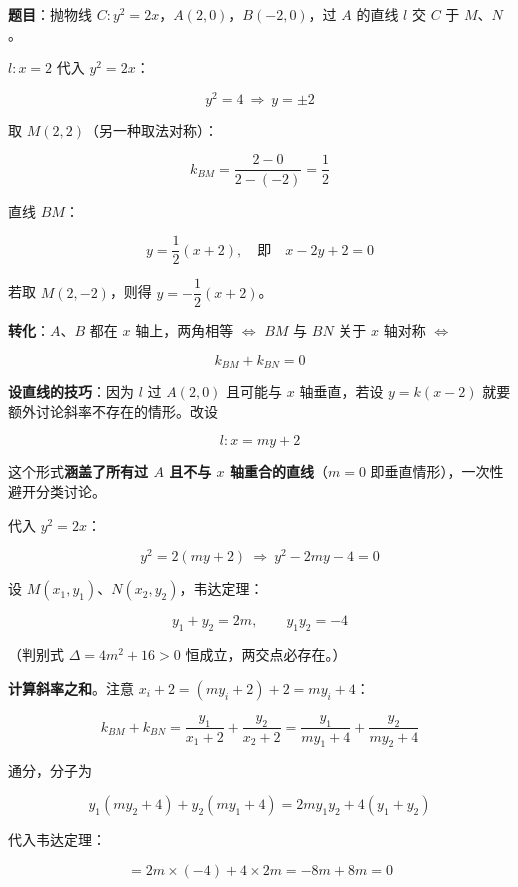 \par\medskip


\textbf{题目}：抛物线 $C:y^{2}=2x$，$A(2,0)$，$B(-2,0)$，过 $A$ 的直线 $l$ 交 $C$ 于 $M$、$N$。


$l:x=2$ 代入 $y^{2}=2x$：

\[y^{2}=4\ \Longrightarrow\ y=\pm2\]

取 $M(2,2)$（另一种取法对称）：

\[k_{BM}=\frac{2-0}{2-(-2)}=\frac12\]

直线 $BM$：

\[y=\frac12(x+2),\quad\text{即}\quad x-2y+2=0\]

若取 $M(2,-2)$，则得 $y=-\dfrac12(x+2)$。



\textbf{转化}：$A$、$B$ 都在 $x$ 轴上，两角相等 $\iff$ $BM$ 与 $BN$ 关于 $x$ 轴对称 $\iff$

\[k_{BM}+k_{BN}=0\]

\textbf{设直线的技巧}：因为 $l$ 过 $A(2,0)$ 且可能与 $x$ 轴垂直，若设 $y=k(x-2)$ 就要额外讨论斜率不存在的情形。改设

\[l:x=my+2\]

这个形式\textbf{涵盖了所有过 $A$ 且不与 $x$ 轴重合的直线}（$m=0$ 即垂直情形），一次性避开分类讨论。

代入 $y^{2}=2x$：

\[y^{2}=2(my+2)\ \Longrightarrow\ y^{2}-2my-4=0\]

设 $M\left(x_1,y_1\right)$、$N\left(x_2,y_2\right)$，韦达定理：

\[y_1+y_2=2m,\qquad y_1y_2=-4\]

（判别式 $\Delta=4m^{2}+16>0$ 恒成立，两交点必存在。）

\textbf{计算斜率之和}。注意 $x_i+2=\left(my_i+2\right)+2=my_i+4$：

\[k_{BM}+k_{BN}=\frac{y_1}{x_1+2}+\frac{y_2}{x_2+2}=\frac{y_1}{my_1+4}+\frac{y_2}{my_2+4}\]

通分，分子为

\[y_1\left(my_2+4\right)+y_2\left(my_1+4\right)=2my_1y_2+4\left(y_1+y_2\right)\]

代入韦达定理：

\[=2m\times(-4)+4\times2m=-8m+8m=0\]

